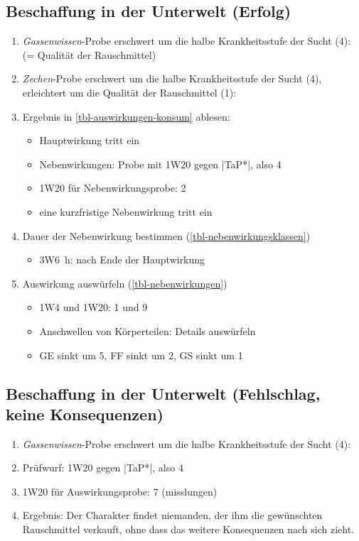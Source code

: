 \subsection{Beschaffung in der Unterwelt (Erfolg)}
\begin{enumerate}
	\item \emph{Gassenwissen}-Probe erschwert um die halbe Krankheitsstufe der Sucht (4):  (= Qualität der Rauschmittel)
	\item \emph{Zechen}-Probe erschwert um die halbe Krankheitsstufe der Sucht (4), erleichtert um die Qualität der Rauschmittel (1): 
	\item Ergebnis in \vref{tbl-auswirkungen-konsum} ablesen:
	\begin{itemize}
		\item Hauptwirkung tritt ein
		\item Nebenwirkungen: Probe mit 1W20 gegen |TaP*|, also 4
		\item 1W20 für Nebenwirkungsprobe: 2
		\item eine kurzfristige Nebenwirkung tritt ein
	\end{itemize}
	\item Dauer der Nebenwirkung bestimmen (\vref{tbl-nebenwirkungsklassen})
	\begin{itemize}
		\item 3W6~h:  nach Ende der Hauptwirkung
	\end{itemize}
	\item Auswirkung auswürfeln (\vref{tbl-nebenwirkungen})
	\begin{itemize}
		\item 1W4 und 1W20: 1 und 9
		\item Anschwellen von Körperteilen: Details auswürfeln
		\item GE sinkt um 5, FF sinkt um 2, GS sinkt um 1
	\end{itemize}
\end{enumerate}

\subsection{Beschaffung in der Unterwelt (Fehlschlag, keine Konsequenzen)}
\begin{enumerate}
	\item \emph{Gassenwissen}-Probe erschwert um die halbe Krankheitsstufe der Sucht (4): 
	\item Prüfwurf: 1W20 gegen |TaP*|, also 4
	\item 1W20 für Auswirkungsprobe: 7 (misslungen)
	\item Ergebnis: Der Charakter findet niemanden, der ihm die gewünschten Rauschmittel verkauft, ohne dass das weitere Konsequenzen nach sich zieht.
\end{enumerate}

